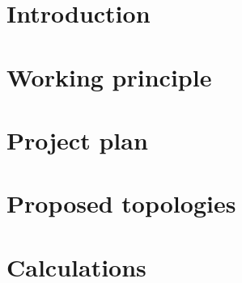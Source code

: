 \section*{Introduction} 
\label{sec:intro}


\pagebreak      %
\section{Working principle}
\label{sec:principle}



\pagebreak      %
\section{Project plan}
\label{sec:plan}


\pagebreak      %
\section{Proposed topologies}
\label{sec:topologies}



\pagebreak      %
\section{Calculations}
\label{sec:calculations}



\pagebreak      %




\pagebreak      %
% 
